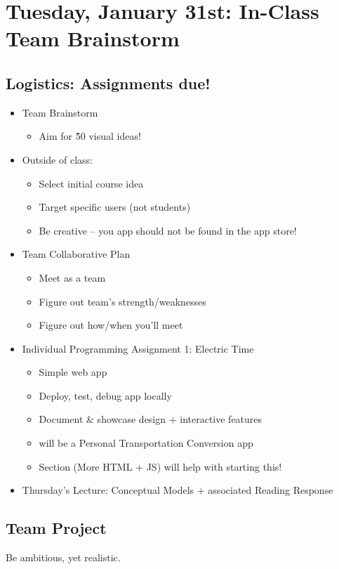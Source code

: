 \section{Tuesday, January 31st: In-Class Team Brainstorm}
\subsection{Logistics: Assignments due!}
\begin{itemize}
    \item Team Brainstorm
    \begin{itemize}
        \item Aim for \~50 visual ideas!
    \end{itemize}
    \item Outside of class:
    \begin{itemize}
        \item Select initial course idea
        \item Target specific users (not students)
        \item Be creative -- you app should not be found in the app store!
    \end{itemize}
    \item Team Collaborative Plan
    \begin{itemize}
        \item Meet as a team
        \item Figure out team's strength/weaknesses
        \item Figure out how/when you'll meet
    \end{itemize}
    \item Individual Programming Assignment 1: Electric Time
    \begin{itemize}
        \item Simple web app
        \item Deploy, test, debug app locally
        \item Document \& showcase design + interactive features
        \item will be a Personal Transportation Conversion app
        \item Section (More HTML + JS) will help with starting this!
    \end{itemize}
    \item Thursday's Lecture: Conceptual Models + associated Reading Response
\end{itemize}

\subsection{Team Project}
\begin{shaded}
Be ambitious, yet realistic.
\end{shaded}
